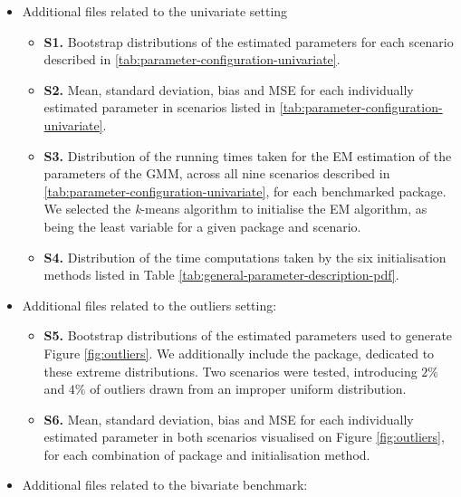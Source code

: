 \begin{itemize}
\item
  Additional files related to the univariate setting

  \begin{itemize}
  \tightlist
  \item
    \textbf{S1.} Bootstrap distributions of the estimated parameters for each
    scenario described in \ref{tab:parameter-configuration-univariate}.
  \item
    \textbf{S2.} Mean, standard deviation, bias and MSE for each individually
    estimated parameter in scenarios listed in \ref{tab:parameter-configuration-univariate}.
  \item
    \textbf{S3.} Distribution of the running times taken for the EM estimation of the parameters of the GMM, across all nine scenarios described in \ref{tab:parameter-configuration-univariate}, for each benchmarked package. We selected the \emph{k}-means algorithm to initialise the EM algorithm, as being the least variable for a given package and scenario.
  \item
    \textbf{S4.} Distribution of the time computations taken by the six initialisation methods listed in Table \ref{tab:general-parameter-description-pdf}.
  \end{itemize}
\item
  Additional files related to the outliers setting:

  \begin{itemize}
  \tightlist
  \item
    \textbf{S5.} Bootstrap distributions of the estimated parameters used to
    generate Figure \ref{fig:outliers}. We additionally include the  package, dedicated to these extreme distributions. Two scenarios were tested, introducing \(2 \%\) and \(4 \%\) of outliers drawn from an improper uniform distribution.
  \item
    \textbf{S6.} Mean, standard deviation, bias and MSE for each individually
    estimated parameter in both scenarios visualised on Figure
    \ref{fig:outliers}, for each combination of package and
    initialisation method.
  \end{itemize}
\item
  Additional files related to the bivariate benchmark:


\end{itemize}
